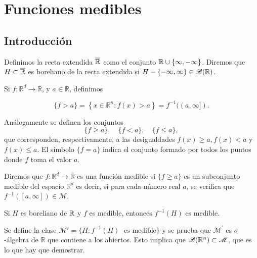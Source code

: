 \chapter{Funciones medibles
}

\section{Introducci\'on}

\begin{definicion}{} Definimos la recta extendida $\overline{\mathbb{R}}$ como el conjunto $\mathbb{R}\cup\{\infty,-\infty\}$. 
Diremos que $H \subset \overline{\mathbb{R}}$ es boreliano de la recta extendida si $H-\{ -\infty, \infty\} \in \mathscr{B}(\mathbb{R})$.
\end{definicion}
 

 Si $f:\mathbb{R}^d\to\overline{\mathbb{R}}$, y  $a\in\mathbb{R}$, definimos

$$
\{f>a\}=\left\{x \in \mathbb{R}^n: f(x)>a\right\}=f^{-1}((a, \infty]) .
$$

Análogamente se definen los conjuntos
$$
\{f \geq a\}, \quad\{f<a\}, \quad\{f \leq a\},
$$
que corresponden, respectivamente, a las desigualdades $f(x) \geq a, f(x)<a$ y $f(x) \leq a$. El símbolo $\{f=a\}$ indica el conjunto formado por todos los puntos donde $f$ toma el valor $a$.







\begin{definicion}{}Diremos que $f:\mathbb{R}^d\to\overline{\mathbb{R}}$  es una función medible si $\{f \geq a\}$ es un subconjunto medible del espacio $\mathbb{R}^d$ es decir, si para cada número real $a$, se verifica
 que   $f^{-1}([a,\infty]) \in \mathscr{M}$. 
\end{definicion}

\begin{teorema}{}
Si $H$ es boreliano de $\mathbb{R}$ y $f$ es medible, entonces $f^{-1}(H)$ es medible.
\end{teorema}


\begin{demo}{} Se define la clase  $\mathscr{M}'=\{ H: f^{-1}(H)\;\mbox{ es medible}\}$ y  se prueba que 
$\mathscr{M}^{'}$ es $\sigma$-\'algebra de $\mathbb{R}$ que contiene a los abiertos. Esto implica que  $\mathscr{B}(\mathbb{R}^n) \subset \mathscr{M}$, que es lo que hay que demostrar.
\end{demo}



